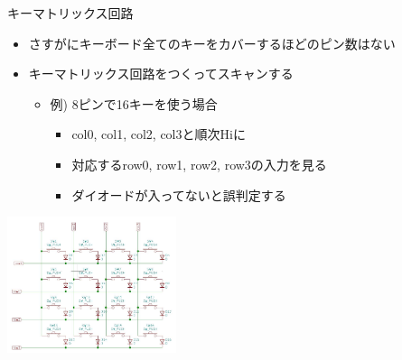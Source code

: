 \documentclass[cjk,dvipdfmx,10pt,compress,fragile%
hyperref={bookmarks=true,bookmarksnumbered=true,bookmarksopen=false,%
colorlinks=false,%
pdftitle={第 134 回 関西 Debian 勉強会},%
pdfauthor={小林},%
pdfsubject={資料},%
}]{beamer}
\begin{document}
\begin{frame}[fragile,t]{キーマトリックス回路}
 \begin{itemize}
  \item さすがにキーボード全てのキーをカバーするほどのピン数はない
  \item キーマトリックス回路をつくってスキャンする
	\begin{itemize}
	 \item 例) 8ピンで16キーを使う場合
	       \begin{itemize}
		\item col0, col1, col2, col3と順次Hiに
		\item 対応するrow0, row1, row2, row3の入力を見る
		\item ダイオードが入ってないと誤判定する
	       \end{itemize}
	\end{itemize}
 \end{itemize}
 \begin{center}
  \includegraphics[keepaspectratio,height=4cm]{./img/key-matrix.jpg}
 \end{center}
\end{frame}
\end{document}
